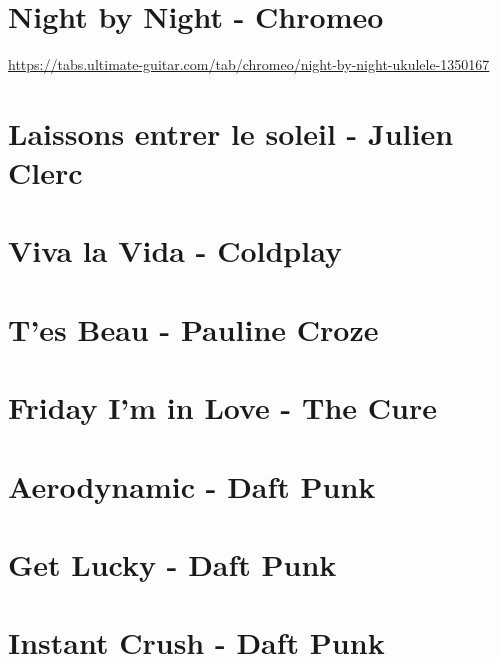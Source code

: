 \documentclass[11pt]{article}
\begin{document}
\section*{Night by Night - Chromeo}
\begin{guitar}
\url{https://tabs.ultimate-guitar.com/tab/chromeo/night-by-night-ukulele-1350167}
\end{guitar}

\section{Laissons entrer le soleil - Julien Clerc}


\section{Viva la Vida - Coldplay}
\begin{guitar}

\end{guitar}



\section{T'es Beau - Pauline Croze}
\begin{guitar}

\end{guitar}


\section{Friday I'm in Love - The Cure}
\begin{guitar}

\end{guitar}


\section{Aerodynamic - Daft Punk}


\section{Get Lucky - Daft Punk}




\section{Instant Crush - Daft Punk}
\begin{guitar}

\end{guitar}
\end{document}
